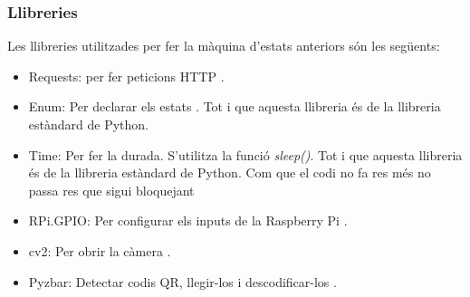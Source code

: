 \subsubsection{Llibreries}
Les llibreries utilitzades per fer la màquina d'estats anteriors
són les següents:
\begin{itemize}
    \item Requests: per fer peticions HTTP \autocite{requests}.
    \item Enum: Per declarar els estats \autocite{enum_python}. Tot i que aquesta llibreria
    és de la llibreria estàndard de Python.
    \item Time: Per fer la durada. S'utilitza la funció \emph{sleep()}. Tot i que aquesta llibreria
    és de la llibreria estàndard de Python.
    Com que el codi no fa res més no passa res que sigui bloquejant \autocite{sleep_python}
    \item RPi.GPIO: Per configurar els inputs de la Raspberry Pi \autocite{gpio_rasp}.
    \item cv2: Per obrir la càmera \autocite{cv2}.
    \item Pyzbar: Detectar codis QR, llegir-los i descodificar-los \autocite{pyzbar}.
\end{itemize}

